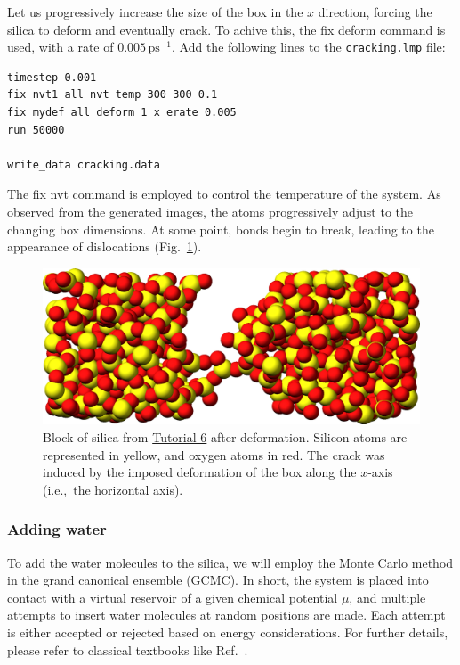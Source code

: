 \documentclass[9pt,tutorial]{livecoms}
\newcommand{\lmpcmd}[1]{\hspace{0pt}\colorbox{listing}{\textcolor{command}{\small{#1}}}\hspace{0pt}} %
\newcommand{\flecmd}[1]{\textcolor{command}{\texttt{#1}}} %
\begin{document}
Let us progressively increase the size of the box in the $x$ direction,
forcing the silica to deform and eventually crack.  To achive this,
the \lmpcmd{fix deform} command is used, with a rate
of $0.005\,\text{ps}^{-1}$.  Add the following lines to
the \flecmd{cracking.lmp} file:
\begin{lstlisting}
timestep 0.001
fix nvt1 all nvt temp 300 300 0.1
fix mydef all deform 1 x erate 0.005
run 50000

write_data cracking.data
\end{lstlisting}
The \lmpcmd{fix nvt} command is employed to control the temperature of the system.
As observed from the generated images, the atoms
progressively adjust to the changing box dimensions.  At some point,
bonds begin to break, leading to the appearance of
dislocations (Fig.~\ref{fig:GCMC-cracked}).

\begin{figure}
\centering
\includegraphics[width=\linewidth]{GCMC-cracked}
\caption{Block of silica from \hyperref[gcmc-silica-label]{Tutorial 6}
after deformation.  Silicon atoms are represented in yellow,
and oxygen atoms in red.  The crack was induced by the
imposed deformation of the box along the $x$-axis (i.e.,~the horizontal axis).}
\label{fig:GCMC-cracked}
\end{figure}

\subsubsection{Adding water}

To add the water molecules to the silica, we will employ the Monte Carlo
method in the grand canonical ensemble (GCMC).  In short, the system is
placed into contact with a virtual reservoir of a given chemical
potential $\mu$, and multiple attempts to insert water molecules at
random positions are made.  Each attempt is either accepted or rejected
based on energy considerations.  For further details, please refer to
classical textbooks like Ref.~.
\end{document}
